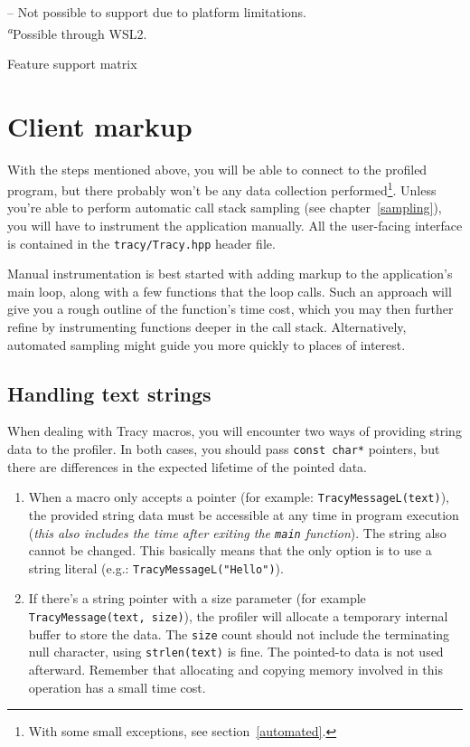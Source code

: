 \documentclass[hidelinks,titlepage,a4paper]{article}
\begin{document}
\begin{table}[h]
\vspace{1em}
\faPoo{} -- Not possible to support due to platform limitations. \\
\textsuperscript{\emph{a}}Possible through WSL2.
\caption{Feature support matrix}
\label{featuretable}
\end{table}

\section{Client markup}
\label{client}

With the steps mentioned above, you will be able to connect to the profiled program, but there probably won't be any data collection performed\footnote{With some small exceptions, see section~\ref{automated}.}. Unless you're able to perform automatic call stack sampling (see chapter~\ref{sampling}), you will have to instrument the application manually. All the user-facing interface is contained in the \texttt{tracy/Tracy.hpp} header file.

Manual instrumentation is best started with adding markup to the application's main loop, along with a few functions that the loop calls. Such an approach will give you a rough outline of the function's time cost, which you may then further refine by instrumenting functions deeper in the call stack. Alternatively, automated sampling might guide you more quickly to places of interest.

\subsection{Handling text strings}
\label{textstrings}

When dealing with Tracy macros, you will encounter two ways of providing string data to the profiler. In both cases, you should pass \texttt{const char*} pointers, but there are differences in the expected lifetime of the pointed data.

\begin{enumerate}
\item When a macro only accepts a pointer (for example: \texttt{TracyMessageL(text)}), the provided string data must be accessible at any time in program execution (\emph{this also includes the time after exiting the \texttt{main} function}). The string also cannot be changed. This basically means that the only option is to use a string literal (e.g.: \texttt{TracyMessageL("Hello")}).

\item If there's a string pointer with a size parameter (for example \texttt{TracyMessage(text, size)}), the profiler will allocate a temporary internal buffer to store the data. The \texttt{size} count should not include the terminating null character, using \texttt{strlen(text)} is fine. The pointed-to data is not used afterward. Remember that allocating and copying memory involved in this operation has a small time cost.
\end{enumerate}
\end{document}
